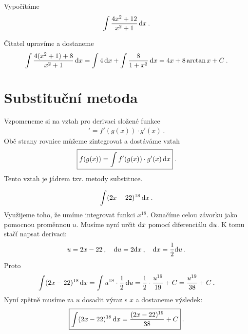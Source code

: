\begin{example}
    Vypočítáme \begin{align}
        \int \frac{4x^2+12}{x^2+1} \, \mathrm{d} x \:.
    \end{align}

    Čitatel upravíme a dostaneme \begin{align}
        \int \frac{4(x^2+1) + 8}{x^2+1} \, \mathrm{d} x = \int 4 \, \mathrm{d} x + \int \frac{8}{1+x^2} \, \mathrm{d} x = 4x + 8 \arctan x + C \:.
    \end{align}
\end{example}

\section*{Substituční metoda}

Vzpomeneme si na vztah pro derivaci složené funkce \begin{align}
    [f(g(x))]' = f'(g(x)) \cdot g'(x) \:.
\end{align}
Obě strany rovnice můžeme zintegrovat a dostáváme vztah \begin{align}
    \boxed{
        f(g(x)) = \int f'(g(x)) \cdot g'(x) \, \mathrm{d} x 
    } \:.
\end{align}
Tento vztah je jádrem tzv. metody substituce.

\begin{example}
    \begin{align}
        \int (2x-22)^{18} \, \mathrm{d} x \:.
    \end{align}
    Využijeme toho, že umíme integrovat funkci $x^{18}$. Označíme celou závorku jako pomocnou proměnnou $u$. Musíme nyní určit $\mathrm{d} x$ pomocí diferenciálu $\mathrm{d} u$. K tomu stačí napsat derivaci:
    \begin{align}
        u = 2x - 22 \:, \quad \mathrm{d} u = 2 \mathrm{d} x \:,\quad \mathrm{d} x = \frac{1}{2} \mathrm{d} u \:.
    \end{align}
    Proto \begin{align}
        \int (2x-22)^{18} \, \mathrm{d} x = \int u^{18} \cdot \frac{1}{2} \, \mathrm{d} u = \frac{1}{2} \cdot \frac{u^{19}}{19} + C = \frac{u^{19}}{38} + C \:.
    \end{align}
    Nyní zpětně musíme za $u$ dosadit výraz s $x$ a dostaneme výsledek:
    \begin{align}
        \boxed{ \int (2x-22)^{18} \, \mathrm{d} x = \frac{(2x-22)^{19}}{38} + C }\:.
    \end{align}
\end{example}

